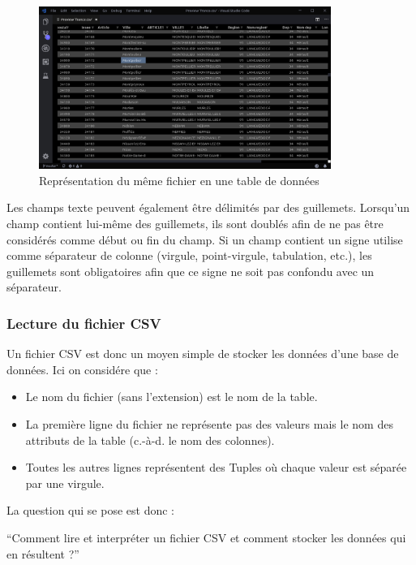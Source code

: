 \documentclass[oneside,13pt,a4paper]{report}
\begin{document}
\begin{figure}[!h]
	\centering
	\includegraphics[width=0.85\textwidth]{img/csv_tables.png}
	\caption{Représentation du même fichier en une table de données}
\end{figure}

Les champs texte peuvent également être délimités par des guillemets. Lorsqu'un champ contient lui-même des guillemets, ils sont doublés afin de ne pas être considérés comme début ou fin du champ. Si un champ contient un signe utilise comme séparateur de colonne (virgule, point-virgule, tabulation, etc.), les guillemets sont obligatoires afin que ce signe ne soit pas confondu avec un séparateur.

\subsubsection{Lecture du fichier CSV}

Un fichier CSV est donc un moyen simple de stocker les données d'une base de données.
Ici on considére que :
\begin{itemize}
	\item Le nom du fichier (sans l’extension) est le nom de la table.
	\item La première ligne du fichier ne représente pas des valeurs mais le nom des attributs de la table (c.-à-d. le nom des colonnes).
	\item Toutes les autres lignes représentent des Tuples où chaque valeur est séparée par une virgule.
\end{itemize}
\vspace{0.3cm}

La question qui se pose est donc :
\begin{center}
	\enquote{Comment lire et interpréter un fichier CSV et comment stocker les données qui en résultent ?}
\end{center}
\end{document}
